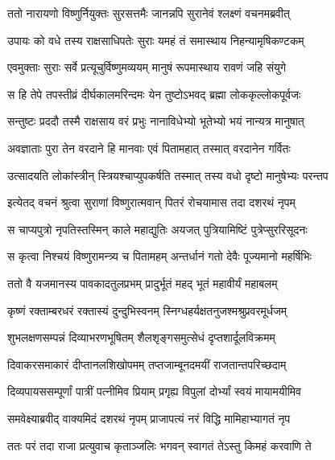 
\twolineshloka
{ततो नारायणो विष्णुर्नियुक्तः सुरसत्तमैः}
{जानन्नपि सुरानेवं श्लक्ष्णं वचनमब्रवीत्} %

\twolineshloka
{उपायः को वधे तस्य राक्षसाधिपतेः सुराः}
{यमहं तं समास्थाय निहन्यामृषिकण्टकम्} %

\twolineshloka
{एवमुक्ताः सुराः सर्वे प्रत्यूचुर्विष्णुमव्ययम्}
{मानुषं रूपमास्थाय रावणं जहि संयुगे} %

\twolineshloka
{स हि तेपे तपस्तीव्रं दीर्घकालमरिन्दमः}
{येन तुष्टोऽभवद् ब्रह्मा लोककृल्लोकपूर्वजः} %

\twolineshloka
{सन्तुष्टः प्रददौ तस्मै राक्षसाय वरं प्रभुः}
{नानाविधेभ्यो भूतेभ्यो भयं नान्यत्र मानुषात्} %

\twolineshloka
{अवज्ञाताः पुरा तेन वरदाने हि मानवाः}
{एवं पितामहात् तस्मात् वरदानेन गर्वितः} %

\twolineshloka
{उत्सादयति लोकांस्त्रीन् स्त्रियश्चाप्युपकर्षति}
{तस्मात् तस्य वधो दृष्टो मानुषेभ्यः परन्तप} %

\twolineshloka
{इत्येतद् वचनं श्रुत्वा सुराणां विष्णुरात्मवान्}
{पितरं रोचयामास तदा दशरथं नृपम्} %

\twolineshloka
{स चाप्यपुत्रो नृपतिस्तस्मिन् काले महाद्युतिः}
{अयजत् पुत्रियामिष्टिं पुत्रेप्सुररिसूदनः} %

\twolineshloka
{स कृत्वा निश्चयं विष्णुरामन्त्र्य च पितामहम्}
{अन्तर्धानं गतो देवैः पूज्यमानो महर्षिभिः} %

\twolineshloka
{ततो वै यजमानस्य पावकादतुलप्रभम्}
{प्रादुर्भूतं महद् भूतं महावीर्यं महाबलम्} %

\twolineshloka
{कृष्णं रक्ताम्बरधरं रक्तास्यं दुन्दुभिस्वनम्}
{स्निग्धहर्यक्षतनुजश्मश्रुप्रवरमूर्धजम्} %

\twolineshloka
{शुभलक्षणसम्पन्नं दिव्याभरणभूषितम्}
{शैलशृङ्गसमुत्सेधं दृप्तशार्दूलविक्रमम्} %

\twolineshloka
{दिवाकरसमाकारं दीप्तानलशिखोपमम्}
{तप्तजाम्बूनदमयीं राजतान्तपरिच्छदाम्} %

\twolineshloka
{दिव्यपायससम्पूर्णां पात्रीं पत्नीमिव प्रियाम्}
{प्रगृह्य विपुलां दोर्भ्यां स्वयं मायामयीमिव} %

\twolineshloka
{समवेक्ष्याब्रवीद् वाक्यमिदं दशरथं नृपम्}
{प्राजापत्यं नरं विद्धि मामिहाभ्यागतं नृप} %

\twolineshloka
{ततः परं तदा राजा प्रत्युवाच कृताञ्जलिः}
{भगवन् स्वागतं तेऽस्तु किमहं करवाणि ते} %

